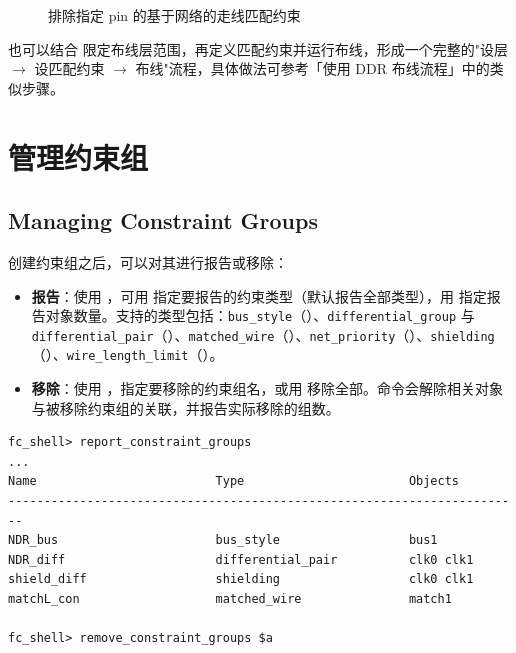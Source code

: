 \begin{figure}[htbp]
\centering
{}
\caption{排除指定 pin 的基于网络的走线匹配约束}
\label{fig:net-matching-exclusion}
\end{figure}

也可以结合  限定布线层范围，再定义匹配约束并运行布线，形成一个完整的"设层 $\to$ 设匹配约束 $\to$ 布线"流程，具体做法可参考「使用 DDR 布线流程」中的类似步骤。

\section{管理约束组}
\subsection*{Managing Constraint Groups}

创建约束组之后，可以对其进行报告或移除：
\begin{itemize}
  \item \textbf{报告}：使用 ，可用  指定要报告的约束类型（默认报告全部类型），用  指定报告对象数量。支持的类型包括：\texttt{bus\_style}（）、\texttt{differential\_group} 与 \texttt{differential\_pair}（）、\texttt{matched\_wire}（）、\texttt{net\_priority}（）、\texttt{shielding}（）、\texttt{wire\_length\_limit}（）。
  \item \textbf{移除}：使用 ，指定要移除的约束组名，或用  移除全部。命令会解除相关对象与被移除约束组的关联，并报告实际移除的组数。
\end{itemize}

\begin{lstlisting}
fc_shell> report_constraint_groups
...
Name                         Type                       Objects
------------------------------------------------------------------------
NDR_bus                      bus_style                  bus1
NDR_diff                     differential_pair          clk0 clk1
shield_diff                  shielding                  clk0 clk1
matchL_con                   matched_wire               match1

fc_shell> remove_constraint_groups $a
\end{lstlisting}

